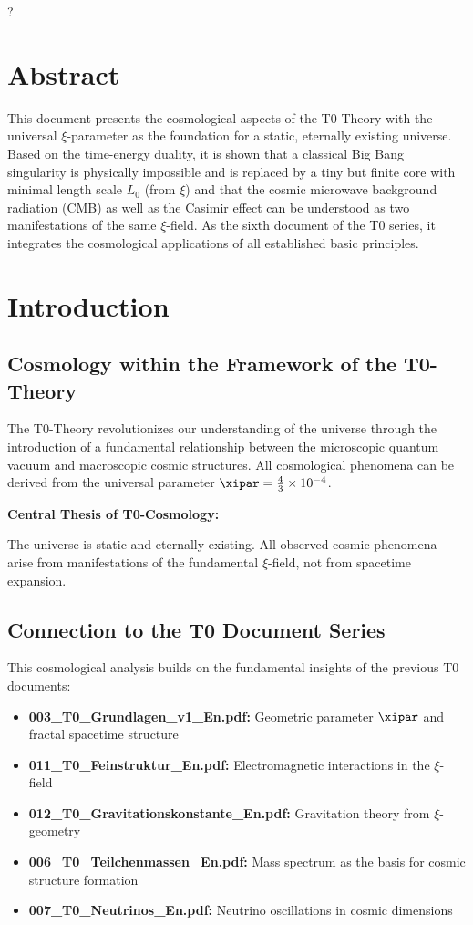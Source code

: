 ?
\section*{Abstract}
		This document presents the cosmological aspects of the T0-Theory with the universal $\xi$-parameter as the foundation for a static, eternally existing universe. Based on the time-energy duality, it is shown that a classical Big Bang singularity is physically impossible and is replaced by a tiny but finite core with minimal length scale $L_0$ (from $\xi$) and that the cosmic microwave background radiation (CMB) as well as the Casimir effect can be understood as two manifestations of the same $\xi$-field. As the sixth document of the T0 series, it integrates the cosmological applications of all established basic principles.

	
	
	\section{Introduction}
	
	\subsection{Cosmology within the Framework of the T0-Theory}
	
	The T0-Theory revolutionizes our understanding of the universe through the introduction of a fundamental relationship between the microscopic quantum vacuum and macroscopic cosmic structures. All cosmological phenomena can be derived from the universal parameter $\xipar = \frac{4}{3} \times 10^{-4}$.
	
	\begin{keyresult}
		\textbf{Central Thesis of T0-Cosmology:}
		
		The universe is static and eternally existing. All observed cosmic phenomena arise from manifestations of the fundamental $\xi$-field, not from spacetime expansion.
	\end{keyresult}
	
	\subsection{Connection to the T0 Document Series}
	
	This cosmological analysis builds on the fundamental insights of the previous T0 documents:
	
	\begin{itemize}
		\item \textbf{003\_T0\_Grundlagen\_v1\_En.pdf:} Geometric parameter $\xipar$ and fractal spacetime structure
		\item \textbf{011\_T0\_Feinstruktur\_En.pdf:} Electromagnetic interactions in the $\xi$-field
		\item \textbf{012\_T0\_Gravitationskonstante\_En.pdf:} Gravitation theory from $\xi$-geometry
		\item \textbf{006\_T0\_Teilchenmassen\_En.pdf:} Mass spectrum as the basis for cosmic structure formation
		\item \textbf{007\_T0\_Neutrinos\_En.pdf:} Neutrino oscillations in cosmic dimensions
	\end{itemize}
	
